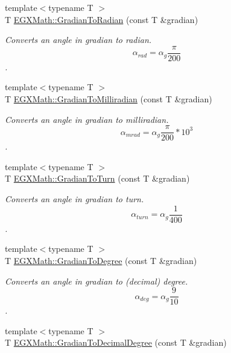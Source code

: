\begin{DoxyCompactItemize}
\item 
{\footnotesize template$<$typename T $>$ }\\T \mbox{\hyperlink{group___e_g_x_math-_angle_conversions-_gradian_ga7ea0a6f47a672715b960181606c8fd7b}{E\+G\+X\+Math\+::\+Gradian\+To\+Radian}} (const T \&gradian)
\begin{DoxyCompactList}\small\item\em Converts an angle in gradian to radian. \[\alpha_{rad}=\alpha_{g}\frac{\pi}{200}\]. \end{DoxyCompactList}\item 
{\footnotesize template$<$typename T $>$ }\\T \mbox{\hyperlink{group___e_g_x_math-_angle_conversions-_gradian_ga144f1019dc760268a163d81fcb3ce482}{E\+G\+X\+Math\+::\+Gradian\+To\+Milliradian}} (const T \&gradian)
\begin{DoxyCompactList}\small\item\em Converts an angle in gradian to milliradian. \[\alpha_{mrad}=\alpha_{g}\frac{\pi}{200}*10^3\]. \end{DoxyCompactList}\item 
{\footnotesize template$<$typename T $>$ }\\T \mbox{\hyperlink{group___e_g_x_math-_angle_conversions-_gradian_ga11b42138910d26474f47c0a2043911c9}{E\+G\+X\+Math\+::\+Gradian\+To\+Turn}} (const T \&gradian)
\begin{DoxyCompactList}\small\item\em Converts an angle in gradian to turn. \[\alpha_{turn}=\alpha_{g}\frac{1}{400}\]. \end{DoxyCompactList}\item 
{\footnotesize template$<$typename T $>$ }\\T \mbox{\hyperlink{group___e_g_x_math-_angle_conversions-_gradian_gaa284952274f16d225951cf5139d0ff4e}{E\+G\+X\+Math\+::\+Gradian\+To\+Degree}} (const T \&gradian)
\begin{DoxyCompactList}\small\item\em Converts an angle in gradian to (decimal) degree. \[\alpha_{deg}=\alpha_{g}\frac{9}{10}\]. \end{DoxyCompactList}\item 
{\footnotesize template$<$typename T $>$ }\\T \mbox{\hyperlink{group___e_g_x_math-_angle_conversions-_gradian_ga346f47c519d5261b689cec49f4a8e789}{E\+G\+X\+Math\+::\+Gradian\+To\+Decimal\+Degree}} (const T \&gradian)

\end{DoxyCompactItemize}

